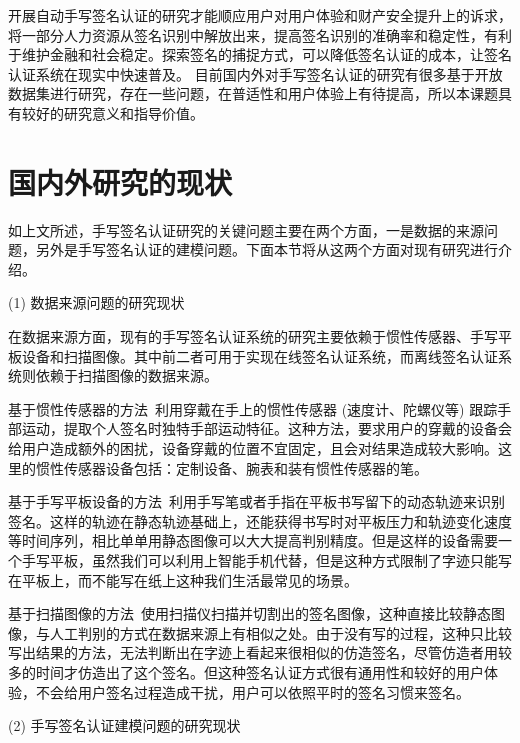 开展自动手写签名认证的研究才能顺应用户对用户体验和财产安全提升上的诉求，将一部分人力资源从签名识别中解放出来，提高签名识别的准确率和稳定性，有利于维护金融和社会稳定。探索签名的捕捉方式，可以降低签名认证的成本，让签名认证系统在现实中快速普及。 目前国内外对手写签名认证的研究有很多基于开放数据集进行研究，存在一些问题，在普适性和用户体验上有待提高，所以本课题具有较好的研究意义和指导价值。

\section{国内外研究的现状}
如上文所述，手写签名认证研究的关键问题主要在两个方面，一是数据的来源问题，另外是手写签名认证的建模问题。下面本节将从这两个方面对现有研究进行介绍。

(1) 数据来源问题的研究现状

在数据来源方面，现有的手写签名认证系统的研究主要依赖于惯性传感器、手写平板设备和扫描图像。其中前二者可用于实现在线签名认证系统，而离线签名认证系统则依赖于扫描图像的数据来源。

基于惯性传感器的方法~\cite{levy2018handwritten,griswold2019wearables,bunke2011online}利用穿戴在手上的惯性传感器 (速度计、陀螺仪等) 跟踪手部运动，提取个人签名时独特手部运动特征。这种方法，要求用户的穿戴的设备会给用户造成额外的困扰，设备穿戴的位置不宜固定，且会对结果造成较大影响。这里的惯性传感器设备包括：定制设备、腕表和装有惯性传感器的笔。

基于手写平板设备的方法~\cite{fischer2015robust,kholmatov2005identity,sae2013simple}利用手写笔或者手指在平板书写留下的动态轨迹来识别签名。这样的轨迹在静态轨迹基础上，还能获得书写时对平板压力和轨迹变化速度等时间序列，相比单单用静态图像可以大大提高判别精度。但是这样的设备需要一个手写平板，虽然我们可以利用上智能手机代替，但是这种方式限制了字迹只能写在平板上，而不能写在纸上这种我们生活最常见的场景。

基于扫描图像的方法~\cite{hafemann2017learning,hafemann2018fixed,ferrer2005offline,kalera2004offline}使用扫描仪扫描并切割出的签名图像，这种直接比较静态图像，与人工判别的方式在数据来源上有相似之处。由于没有写的过程，这种只比较写出结果的方法，无法判断出在字迹上看起来很相似的仿造签名，尽管仿造者用较多的时间才仿造出了这个签名。但这种签名认证方式很有通用性和较好的用户体验，不会给用户签名过程造成干扰，用户可以依照平时的签名习惯来签名。

(2) 手写签名认证建模问题的研究现状

